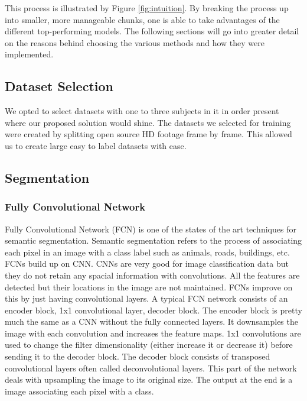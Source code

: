 This process is illustrated by Figure \ref{fig:intuition}. By breaking the process up into smaller, more manageable chunks, one is able to take advantages of the different top-performing models. The following sections will go into greater detail on the reasons behind choosing the various methods and how they were implemented.

\subsection{Dataset Selection}

We opted to select datasets with one to three subjects in it in order present
where our proposed solution would shine. The datasets we selected for training
were created by splitting open source HD footage frame by frame. This allowed us
to create large easy to label datasets with ease.

\subsection{Segmentation}
\subsubsection{Fully Convolutional Network}

Fully Convolutional Network (FCN) is one of the states of the art techniques for
semantic segmentation. Semantic segmentation \cite{Liu2018} refers to the process of
associating each pixel in an image with a class label such as animals, roads,
buildings, etc. FCNs build up on CNN. CNNs are very good for image
classification data but they do not retain any spacial information with
convolutions. All the features are detected but their locations in the image are
not maintained. FCNs improve on this by just having convolutional layers. A
typical FCN network consists of an encoder block, 1x1 convolutional layer,
decoder block. The encoder block is pretty much the same as a CNN without the
fully connected layers. It downsamples the image with each convolution and
increases the feature maps. 1x1 convolutions are used to change the filter
dimensionality (either increase it or decrease it) before sending it to the
decoder block. The decoder block consists of transposed convolutional layers
often called deconvolutional layers. This part of the network deals with
upsampling the image to its original size. The output at the end is a image
associating each pixel with a class.

